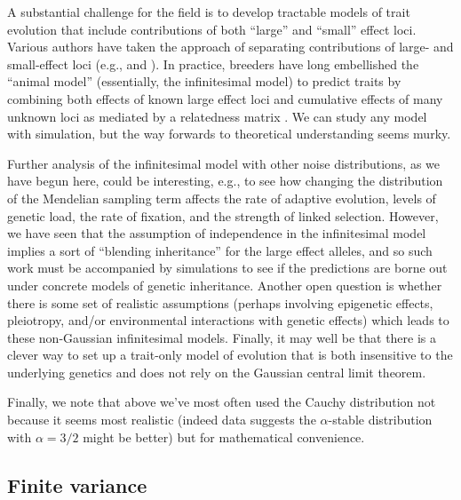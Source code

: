 \documentclass{article}
\newcommand{\1}{\mathbbm{1}}
\theoremstyle{remark}
\theoremstyle{definition}
\begin{document}
A substantial challenge for the field is to develop tractable models of trait evolution
that include contributions of both ``large'' and ``small'' effect loci.
Various authors have taken the approach of separating contributions of large- and small-effect loci
(e.g., \citet{lande1983response} and \citet{chevin2008selective}). 
In practice, breeders have long embellished the ``animal model'' (essentially, the infinitesimal model)
to predict traits
by combining both effects of known large effect loci
and cumulative effects of many unknown loci as mediated by a relatedness matrix
\citep[e.g.,][]{fernando1989marker,teissier2018weighted,bernardo2014genomewide,rice2019evaluation}.
We can study any model with simulation,
but the way forwards to theoretical understanding seems murky.

Further analysis of the infinitesimal model with other noise distributions,
as we have begun here,
could be interesting,
e.g., to see how changing the distribution of the Mendelian sampling term
affects the rate of adaptive evolution,
levels of genetic load,
the rate of fixation,
and the strength of linked selection.
However,
we have seen that the assumption of independence in the infinitesimal model
implies a sort of ``blending inheritance''
for the large effect alleles,
and so such work must be accompanied by simulations
to see if the predictions are borne out under concrete models of genetic inheritance.
Another open question is whether there is some set of realistic assumptions
(perhaps involving epigenetic effects, pleiotropy, and/or environmental interactions with genetic effects)
which leads to these non-Gaussian infinitesimal models.
Finally, it may well be that there is a clever way to set up a trait-only model of evolution
that is both insensitive to the underlying genetics
and does not rely on the Gaussian central limit theorem.

Finally, we note that above we've most often used the Cauchy distribution
not because it seems most realistic
(indeed data suggests the $\alpha$-stable distribution with $\alpha=3/2$ might be better) 
but for mathematical convenience.

\subsection*{Finite variance}
\end{document}
